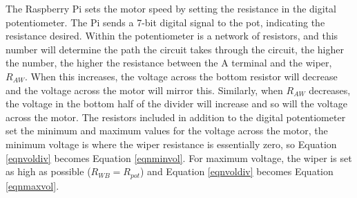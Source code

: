 \documentclass[twoside,a4]{report}
\begin{document}
	The Raspberry Pi sets the motor speed by setting the resistance in the digital potentiometer. The Pi sends a 7-bit digital signal to the pot, indicating the resistance desired. Within the potentiometer is a network of resistors, and this number will determine the path the circuit takes through the circuit, the higher the number, the higher the resistance between the A terminal and the wiper, \(R_{AW}\). When this increases, the voltage across the bottom resistor will decrease and the voltage across the motor will mirror this. Similarly, when \(R_{AW}\) decreases, the voltage in the bottom half of the divider will increase and so will the voltage across the motor. The resistors included in addition to the digital potentiometer set the minimum and maximum values for the voltage across the motor, the minimum voltage is where the wiper resistance is essentially zero, so Equation \ref{eqnvoldiv} becomes Equation \ref{eqnminvol}. For maximum voltage, the wiper is set as high as possible (\(R_{WB} = R_{pot}\)) and Equation \ref{eqnvoldiv} becomes Equation \ref{eqnmaxvol}. \newline


\end{document}
